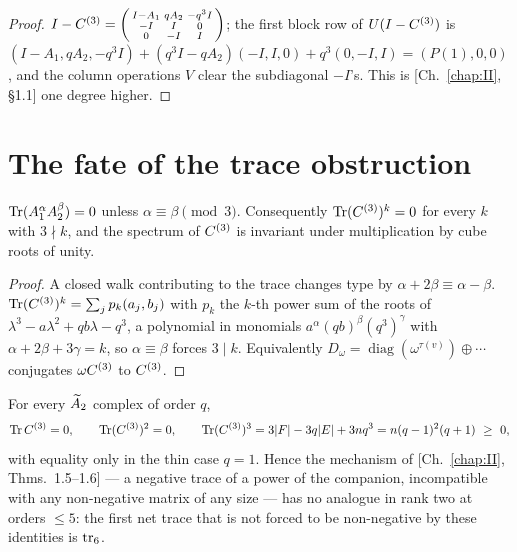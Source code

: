 \begin{proof}
$I-C^{(3)}=\begin{psmallmatrix}I-A_1&qA_2&-q^{3}I\\-I&I&0\\0&-I&I\end{psmallmatrix}$; the
first block row of $U(I-C^{(3)})$ is $(I-A_1,qA_2,-q^{3}I)+(q^{3}I-qA_2)(-I,I,0)
+q^{3}(0,-I,I)=(P(1),0,0)$, and the column operations $V$ clear the subdiagonal $-I$'s.
This is [Ch.~\ref{chap:II}, \S1.1] one degree higher.
\end{proof}

\section{The fate of the trace obstruction}\label{X:sec:trace}

\begin{theorem}[Grading]\label{X:thm:grading}
$\operatorname{Tr}(A_1^{\alpha}A_2^{\beta})=0$ unless $\alpha\equiv\beta\pmod3$. Consequently
$\operatorname{Tr}(C^{(3)})^{k}=0$ for every $k$ with $3\nmid k$, and the spectrum of $C^{(3)}$ is
invariant under multiplication by cube roots of unity.
\end{theorem}

\begin{proof}
A closed walk contributing to the trace changes type by $\alpha+2\beta\equiv\alpha-\beta$.
$\operatorname{Tr}(C^{(3)})^{k}=\sum_jp_k(a_j,b_j)$ with $p_k$ the $k$-th power sum of the roots of
$\lambda^{3}-a\lambda^{2}+qb\lambda-q^{3}$, a polynomial in monomials $a^{\alpha}(qb)^{\beta}
(q^{3})^{\gamma}$ with $\alpha+2\beta+3\gamma=k$, so $\alpha\equiv\beta$ forces $3\mid k$.
Equivalently $D_\omega=\operatorname{diag}(\omega^{\tau(v)})\oplus\cdots$ conjugates
$\omega C^{(3)}$ to $C^{(3)}$.
\end{proof}

\begin{theorem}\label{X:thm:notrace}
For every $\widetilde A_2$ complex of order $q$,
\[
\operatorname{Tr}C^{(3)}=0,\qquad\operatorname{Tr}(C^{(3)})^{2}=0,\qquad
\operatorname{Tr}(C^{(3)})^{3}=3|F|-3q|E|+3nq^{3}=n(q-1)^{2}(q+1)\ \ge\ 0,
\]
with equality only in the thin case $q=1$. Hence the mechanism of {\rm[Ch.~\ref{chap:II}, Thms.~1.5--1.6]}
--- a negative trace of a power of the companion, incompatible with any non-negative
matrix of any size --- has no analogue in rank two at orders $\le5$: the first net trace
that is not forced to be non-negative by these identities is $\operatorname{tr}_6$.
\end{theorem}


